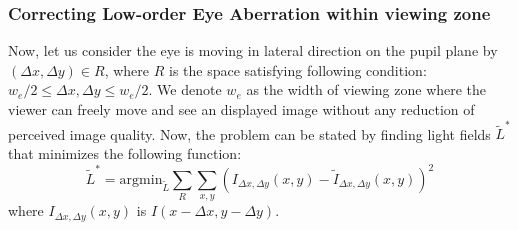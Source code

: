 
\subsubsection{Correcting Low-order Eye Aberration within viewing zone}
Now, let us consider the eye is moving in lateral direction on the pupil plane by $(\Delta x, \Delta y) \in R$, where  $R$ is the space satisfying following condition: $w_e/2 \leq \Delta x, \Delta y \leq  w_e/2$. We denote $w_e$ as the width of viewing zone where the viewer can freely move and see an displayed image without any reduction of perceived image quality. Now, the problem can be stated by finding light fields $\tilde{L}^{*}$ that minimizes the following function:
\begin{equation}
	\tilde{L}^{*} = \text{argmin}_{\tilde{L}} \sum_{R}\sum_{x,y} (I_{\Delta x, \Delta y}(x,y)-\tilde{I}_{\Delta x, \Delta y}(x,y))^{2}
\end{equation}
where $I_{\Delta x, \Delta y}(x,y)$ is $I(x-\Delta x,y-\Delta y)$.






